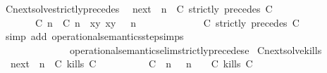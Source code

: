 \begin{isabellebody}
\ Cnext{\isacharunderscore}solve{\isacharunderscore}strictly{\isacharunderscore}precedes{\isacharcolon}\isanewline
\ \ {\isacartoucheopen}{\isacharparenleft}{\isasymC}\isactrlsub n\isactrlsub e\isactrlsub x\isactrlsub t\ {\isacharparenleft}{\isasymGamma}{\isacharcomma}\ n\ {\isasymturnstile}\ {\isacharparenleft}{\isacharparenleft}C\ strictly\ precedes\ C\ {\isacharhash}\ {\isasymPsi}{\isacharparenright}\ {\isasymtriangleright}\ {\isasymPhi}{\isacharparenright}{\isacharparenright}\isanewline
\ \ \ \ {\isasymsupseteq}\ {\isacharbraceleft}\ {\isacharparenleft}{\isacharparenleft}{\isasymlceil}{\isacharhash}\isactrlsup {\isasymle}\ C\ n{\isacharcomma}\ {\isacharhash}\isactrlsup {\isacharless}\ C\ n{\isasymrceil}\ {\isasymin}\ {\isacharparenleft}{\isasymlambda}{\isacharparenleft}x{\isacharcomma}y{\isacharparenright}{\isachardot}\ x{\isasymle}y{\isacharparenright}{\isacharparenright}\ {\isacharhash}\ {\isasymGamma}{\isacharparenright}{\isacharcomma}\ n\isanewline
\ \ \ \ \ \ \ \ \ \ {\isasymturnstile}\ {\isasymPsi}\ {\isasymtriangleright}\ {\isacharparenleft}{\isacharparenleft}C\ strictly\ precedes\ C\ {\isacharhash}\ {\isasymPhi}{\isacharparenright}\ {\isacharbraceright}{\isacartoucheclose}\isanewline
%
\isadelimproof
%
\endisadelimproof
%
\isatagproof
{}\isamarkupfalse%
\ {\isacharparenleft}simp\ add{\isacharcolon}\ operational{\isacharunderscore}semantics{\isacharunderscore}step{\isachardot}simps\isanewline
\ \ \ \ \ \ \ \ \ \ \ \ \ \ operational{\isacharunderscore}semantics{\isacharunderscore}elim{\isachardot}strictly{\isacharunderscore}precedes{\isacharunderscore}e{\isacharparenright}%
\endisatagproof
{\isafoldproof}%
%
\isadelimproof
\isanewline
%
\endisadelimproof
\isanewline
{}\isamarkupfalse%
\ Cnext{\isacharunderscore}solve{\isacharunderscore}kills{\isacharcolon}\isanewline
\ \ {\isacartoucheopen}{\isacharparenleft}{\isasymC}\isactrlsub n\isactrlsub e\isactrlsub x\isactrlsub t\ {\isacharparenleft}{\isasymGamma}{\isacharcomma}\ n\ {\isasymturnstile}\ {\isacharparenleft}{\isacharparenleft}C\ kills\ C\ {\isacharhash}\ {\isasymPsi}{\isacharparenright}\ {\isasymtriangleright}\ {\isasymPhi}{\isacharparenright}{\isacharparenright}\isanewline
\ \ \ \ {\isasymsupseteq}\ {\isacharbraceleft}\ {\isacharparenleft}{\isacharparenleft}C\ {\isasymnot}{\isasymUp}\ n{\isacharparenright}\ {\isacharhash}\ {\isasymGamma}{\isacharparenright}{\isacharcomma}\ n\ {\isasymturnstile}\ {\isasymPsi}\ {\isasymtriangleright}\ {\isacharparenleft}{\isacharparenleft}C\ kills\ C\ {\isacharhash}\ {\isasymPhi}{\isacharparenright}{\isacharcomma}\isanewline

\end{isabellebody}
